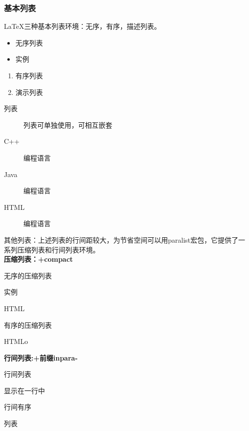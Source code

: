 \documentclass[16pt]{article}
\begin{document}
\subsubsection{基本列表}
\LaTeX{}三种基本列表环境：无序，有序，描述列表。
\begin{itemize}
    \item 无序列表
    \item 实例
\end{itemize}
\begin{enumerate}
    \item 有序列表
    \item 演示列表
\end{enumerate}
\begin{description}
    \item[列表] 列表可单独使用，可相互嵌套
    \item[C++] 编程语言
    \item[Java] 编程语言
    \item[HTML] 编程语言
\end{description} \par
其他列表：上述列表的行间距较大，为节省空间可以用paralist宏包，它提供了一系列压缩列表和行间列表环境。\\
\textbf{压缩列表：+compact}
\begin{compactitem}
    \item 无序的压缩列表
    \item 实例
    \item HTML
\end{compactitem}
\begin{compactenum}
    \item 有序的压缩列表
    \item HTMLo
\end{compactenum}
\textbf{行间列表:+前缀inpara-}

\begin{inparaitem}
    \item 行间列表
    \item 显示在一行中
\end{inparaitem}
\par
\begin{inparaenum}
    \item 行间有序
    \item 列表
\end{inparaenum}
\end{document}
